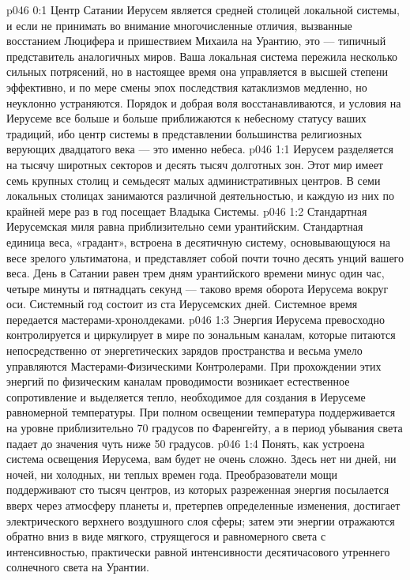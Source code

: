 \author{Архангел}
\vs p046 0:1 Центр Сатании Иерусем является средней столицей локальной системы, и если не принимать во внимание многочисленные отличия, вызванные восстанием Люцифера и пришествием Михаила на Урантию, это --- типичный представитель аналогичных миров. Ваша локальная система пережила несколько сильных потрясений, но в настоящее время она управляется в высшей степени эффективно, и по мере смены эпох последствия катаклизмов медленно, но неуклонно устраняются. Порядок и добрая воля восстанавливаются, и условия на Иерусеме все больше и больше приближаются к небесному статусу ваших традиций, ибо центр системы в представлении большинства религиозных верующих двадцатого века --- это именно небеса.
\vs p046 1:1 Иерусем разделяется на тысячу широтных секторов и десять тысяч долготных зон. Этот мир имеет семь крупных столиц и семьдесят малых административных центров. В семи локальных столицах занимаются различной деятельностью, и каждую из них по крайней мере раз в год посещает Владыка Системы.
\vs p046 1:2 \pc Стандартная Иерусемская миля равна приблизительно семи урантийским. Стандартная единица веса, «градант», встроена в десятичную систему, основывающуюся на весе зрелого ультиматона, и представляет собой почти точно десять унций вашего веса. День в Сатании равен трем дням урантийского времени минус один час, четыре минуты и пятнадцать секунд --- таково время оборота Иерусема вокруг оси. Системный год состоит из ста Иерусемских дней. Системное время передается мастерами\hyp{}хронолдеками.
\vs p046 1:3 \pc Энергия Иерусема превосходно контролируется и циркулирует в мире по зональным каналам, которые питаются непосредственно от энергетических зарядов пространства и весьма умело управляются Мастерами\hyp{}Физическими Контролерами. При прохождении этих энергий по физическим каналам проводимости возникает естественное сопротивление и выделяется тепло, необходимое для создания в Иерусеме равномерной температуры. При полном освещении температура поддерживается на уровне приблизительно 70 градусов по Фаренгейту, а в период убывания света падает до значения чуть ниже 50 градусов.
\vs p046 1:4 \pc Понять, как устроена система освещения Иерусема, вам будет не очень сложно. Здесь нет ни дней, ни ночей, ни холодных, ни теплых времен года. Преобразователи мощи поддерживают сто тысяч центров, из которых разреженная энергия посылается вверх через атмосферу планеты и, претерпев определенные изменения, достигает электрического верхнего воздушного слоя сферы; затем эти энергии отражаются обратно вниз в виде мягкого, струящегося и равномерного света с интенсивностью, практически равной интенсивности десятичасового утреннего солнечного света на Урантии.
